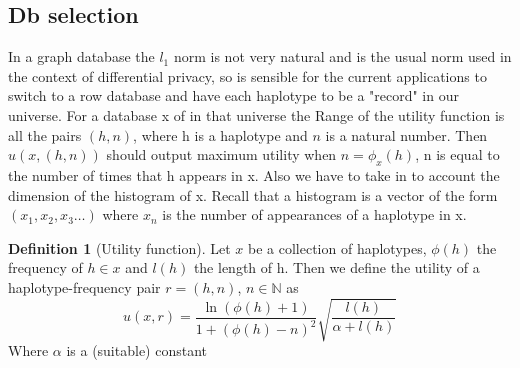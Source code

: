 \documentclass[12pt]{article}
\theoremstyle{definition}
\newtheorem{definition}{Definition}[section]
\begin{document}
\subsection*{Db selection}
In a graph database the $l_1$  norm is not very natural and is the usual norm used in
the context of differential privacy, so is sensible for the current applications to
switch to a row database and have each haplotype to be a  "record" in our universe.
For a database x of in that universe the Range of the utility function is all the pairs
$(h,n)$, where h is a haplotype and $n$ is  a natural number.
Then $u(x,(h,n))$ should output maximum utility when  $n = \phi_x(h)$, n is equal to
the number of times that h appears in x. Also we have to take in to account the dimension
of the histogram of x. Recall that  a histogram is a vector of the form $(x_1, x_2, x_3 \ldots)$
where $x_n$ is the number of appearances of a haplotype in x.

\begin{definition}[Utility function]

        Let $x$ be a collection of haplotypes, $\phi(h)$ the frequency of  $h\in x$ and $l(h)$ the length of
        h. Then we define the utility of a haplotype-frequency pair $r=(h,n)$, $n\in \mathbb{N}$ as
\begin{equation}
        u(x,r) =   \frac{\ln (\phi(h)+1)} {1+(\phi (h) - n)^2}   \sqrt{\frac{l(h)}{\alpha+l(h)} }
\end{equation}
        Where $\alpha$ is a (suitable) constant
\end{definition}

% 

\end{document}
